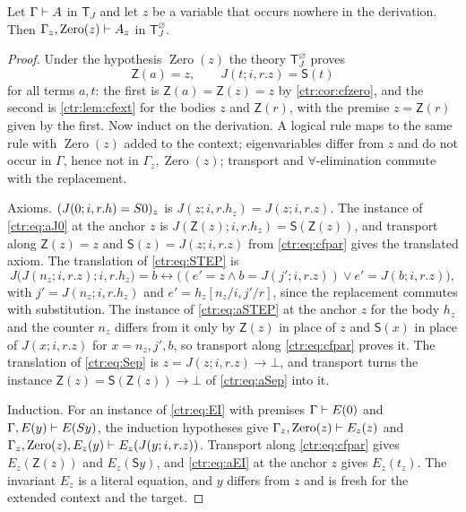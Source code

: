 \begin{lemma}\label{ctr:lem:cfup}
Let $\Gamma\vdash A$ in $\mathsf T_J$ and let $z$ be a variable that occurs nowhere in the
derivation. Then $\Gamma_z,\operatorname{Zero}(z)\vdash A_z$ in
$\mathsf T_J^{\varnothing}$.
\end{lemma}
\begin{proof}
Under the hypothesis $\operatorname{Zero}(z)$ the theory $\mathsf T_J^{\varnothing}$ proves
\begin{equation}\label{ctr:eq:cfpar}
 \mathsf Z(a)=z,\qquad J(t;i,r.z)=\mathsf S(t)
\end{equation}
for all terms $a,t$: the first is $\mathsf Z(a)=\mathsf Z(z)=z$ by
\cref{ctr:cor:cfzero}, and the second is \cref{ctr:lem:cfext} for the bodies $z$ and
$\mathsf Z(r)$, with the premise $z=\mathsf Z(r)$ given by the first. Now induct on the
derivation. A logical rule maps to the same rule with $\operatorname{Zero}(z)$ added to the
context; eigenvariables differ from $z$ and do not occur in $\Gamma$, hence not in
$\Gamma_z,\operatorname{Zero}(z)$; transport and $\forall$-elimination commute with the
replacement.

Axioms. $(J(0;i,r.h)=S 0)_z$ is $J(z;i,r.h_z)=J(z;i,r.z)$. The instance of
\eqref{ctr:eq:aJ0} at the anchor $z$ is $J(\mathsf Z(z);i,r.h_z)=\mathsf S(\mathsf Z(z))$, and
transport along $\mathsf Z(z)=z$ and $\mathsf S(z)=J(z;i,r.z)$ from \eqref{ctr:eq:cfpar}
gives the translated axiom. The translation of \eqref{ctr:eq:STEP} is
\[
 J\bigl(J(n_z;i,r.z);i,r.h_z\bigr)=b\leftrightarrow
 \bigl((e'=z\land b=J(j';i,r.z))\lor e'=J(b;i,r.z)\bigr),
\]
with $j'=J(n_z;i,r.h_z)$ and $e'=h_z[n_z/i,j'/r]$, since the replacement commutes with
substitution. The instance of \eqref{ctr:eq:aSTEP} at the anchor $z$ for the body $h_z$ and
the counter $n_z$ differs from it only by $\mathsf Z(z)$ in place of $z$ and $\mathsf S(x)$
in place of $J(x;i,r.z)$ for $x=n_z,j',b$, so transport along \eqref{ctr:eq:cfpar} proves
it. The translation of \eqref{ctr:eq:Sep} is $z=J(z;i,r.z)\to\bot$, and transport turns the
instance $\mathsf Z(z)=\mathsf S(\mathsf Z(z))\to\bot$ of \eqref{ctr:eq:aSep} into it.

Induction. For an instance of \eqref{ctr:eq:EI} with premises $\Gamma\vdash E(0)$ and
$\Gamma,E(y)\vdash E(S y)$, the induction hypotheses give
$\Gamma_z,\operatorname{Zero}(z)\vdash E_z(z)$ and
$\Gamma_z,\operatorname{Zero}(z),E_z(y)\vdash E_z(J(y;i,r.z))$. Transport along
\eqref{ctr:eq:cfpar} gives $E_z(\mathsf Z(z))$ and $E_z(\mathsf S y)$, and
\eqref{ctr:eq:aEI} at the anchor $z$ gives $E_z(t_z)$. The invariant $E_z$ is a literal
equation, and $y$ differs from $z$ and is fresh for the extended context and the target.
\end{proof}


